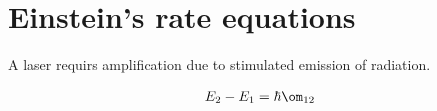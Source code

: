 \documentclass[a4paper, 11pt, normalem]{report}
\begin{document}
\chapter{Einstein's rate equations}
A laser requirs amplification due to stimulated emission of radiation. 
\begin{multicols}{2}
\begin{figure}[H]
    \centering
\end{figure}
\begin{align}
    E_2 - E_1 = \hbar\om_{12}
\end{align}
\end{multicols}
\end{document}
